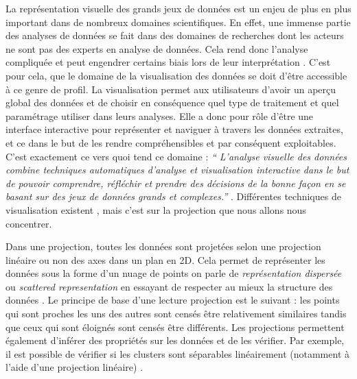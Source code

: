 
La représentation visuelle des grands jeux de données est un enjeu de plus en plus important dans de nombreux domaines scientifiques. En effet, une immense partie des analyses de données se fait dans des domaines de recherches dont les acteurs ne sont pas des experts en analyse de données. Cela rend donc l’analyse compliquée et peut engendrer certains biais lors de leur interprétation \cite{HeulotAnEvaluation}. C’est pour cela, que le domaine de la visualisation des données se doit d’être accessible à ce genre de profil.\newline
La visualisation permet aux utilisateurs d’avoir un aperçu global des données et de choisir en conséquence quel type de traitement et quel paramétrage utiliser dans leurs analyses. Elle a donc pour rôle d’être une interface interactive pour représenter et naviguer à travers les données extraites, et ce dans le but de les rendre compréhensibles et par conséquent exploitables\cite{card1999readings}. C’est exactement ce vers quoi tend ce domaine : \textit{“ L'analyse visuelle des données combine techniques automatiques d'analyse et visualisation interactive dans le but de pouvoir comprendre, réfléchir et prendre des décisions de la bonne façon en se basant sur des jeux de données grands et complexes.”} \cite{keim2008visual}. 
Différentes techniques de visualisation existent \cite{HeulotThese}, mais c’est sur la projection que nous allons nous concentrer. 
\smallskip

    Dans une projection, toutes les données sont projetées selon une projection linéaire ou non des axes dans un plan en 2D. Cela permet de représenter les données sous la forme d’un nuage de points on parle de \textit{représentation dispersée} ou \textit{scattered representation} en essayant de respecter au mieux la structure des données \cite{HeulotThese}. \newline 
    Le principe de base d'une lecture projection est le suivant : les points qui sont proches les uns des autres sont censés être relativement similaires tandis que ceux qui sont éloignés sont censés être différents. \newline 
    Les projections permettent également d’inférer des propriétés sur les données et de les vérifier. Par exemple, il est possible de vérifier si les clusters sont séparables linéairement (notamment à l’aide d’une projection linéaire) \cite{HeulotThese} .
\smallskip

